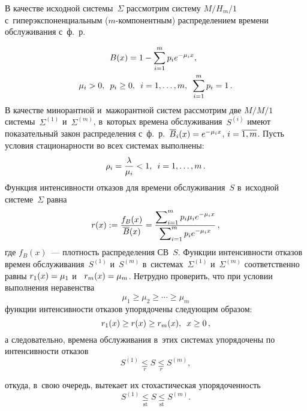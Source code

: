\begin{multicols}{2}
\vspace*{-2pt}

В качестве исходной системы~$\Sigma$ рассмотрим сис\-те\-му $M/H_m/1$  с~гиперэкспоненциальным (\mbox{$m$-ком}\-по\-нент\-ным) распределением времени обслуживания 
с~ф.~р.

\vspace*{-3pt}

\noindent
\begin{multline*}
\hspace*{-5.88843pt}B(x)= 1 -  \sum\limits_{i=1}^m p_i e^{-\mu_i x}, \\
\mu_i > 0,\enskip p_i\ge  0,\enskip i=1,\dots,m, \enskip 
\sum\limits_{i=1}^m p_i=1\,.
\end{multline*}
В качестве минорантной и~мажорантной сис\-тем рассмотрим две $M/M/1$ сис\-те\-мы~$\Sigma^{(1)}$ 
и~$\Sigma^{(m)}$, в~которых  времена обслуживания~$S^{(i)}$  
имеют показательный закон распределения с~ф.~р.\ $\overline B_i(x) \hm= e^{-\mu_i  x}$, $i\hm=\overline{1,m}$.
Пусть условия стационарности во всех системах выполнены:
$$
\rho_i=\displaystyle\frac{\displaystyle \lambda\mathstrut}{\displaystyle \mu_i\mathstrut} <1, \enskip i=1,\dots,m\,.
$$
Функция интенсивности отказов для времени обслуживания~$S$ в~исходной системе~$\Sigma$ равна
$$
r(x):= \displaystyle\frac{\displaystyle f_B(x)\mathstrut}{\displaystyle \overline B(x)\mathstrut}= \displaystyle\frac{\displaystyle \sum\nolimits_{i=1}^m p_i \mu_i e^{-\mu_i x} \mathstrut}{\displaystyle \sum\nolimits_{i=1}^m p_ie^{-\mu_i x}\mathstrut}\,,
$$
где $f_B(x)$~--- плотность распределения СВ~$S$.
Функции интенсивности отказов времен обслуживания~$S^{(1)}$ и~$S^{(m)}$ в~сис\-те\-мах~$\Sigma^{(1)}$ 
и~$\Sigma^{(m)}$ соответственно равны $r_1(x)\hm=\mu_1$ и~$\ r_m(x)\hm=\mu_m$.
Нетрудно проверить, что при условии выполнения неравенства
\begin{equation}
    \label{failure}
    \mu_1 \ge \mu_2\ge\cdots \ge \mu_m
\end{equation}
функции интенсивности отказов упорядочены сле\-ду\-ющим образом:
$$
r_1 (x)\ge r(x) \ge r_m(x), \enskip x\ge 0\,,
$$
а следовательно, времена обслуживания в~этих сис\-те\-мах упорядочены по 
интенсивности отказов
$$
S^{(1)} \underset{r}{\le}  S \underset{r}{\le} S^{(m)},
 $$
 
 

\noindent
откуда, в~свою очередь, вытекает их стохастическая упо\-ря\-до\-чен\-ность~\cite{Ross}
$$
S^{(1)} \underset{\mathrm{st}}{\le}  S \underset{\mathrm{st}}{\le} S^{(m)}. $$

{ \begin{center}  %
 \vspace*{-2pt}
     \mbox{%
\epsfxsize=79.029mm
}


\end{center}}
\end{multicols}
